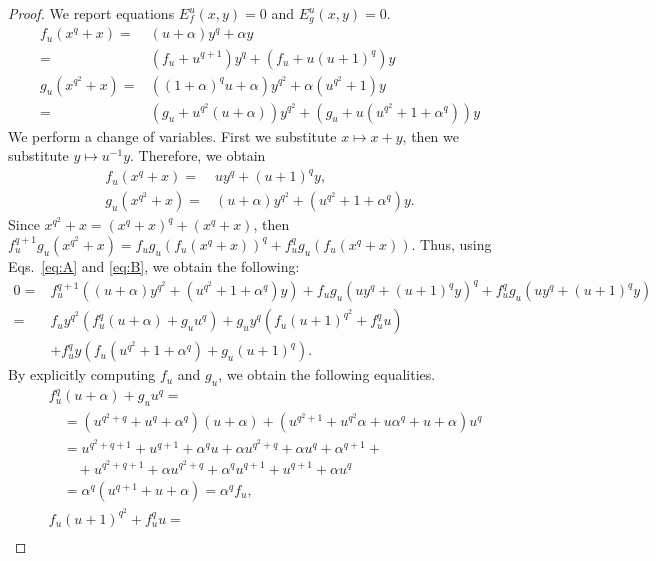 \documentclass{article}
\begin{document}
\begin{proof}
We report equations $E_f^u(x,y)=0$ and  $E_g^u(x,y)=0$.
\begin{align*}
   f_u(x^q+x)=&{(u+\alpha)}y^q+{\alpha} y\\
   =&\left(f_u+{u^{q+1}}\right)y^q+\left(f_u+{u(u+1)^q}\right)y\\
    g_u(x^{q^2}+x)=&{((1+\alpha)^qu+\alpha)}y^{q^2}+{\alpha(u^{q^2}+1)}y\\
    =&\left(g_u+{u^{q^2}(u+\alpha)}\right)y^{q^2}+\left(g_u+{u(u^{q^2}+1+\alpha^q)}\right)y
\end{align*}
We perform  a change of variables. First we substitute $x\mapsto x+y$, then we substitute $y\mapsto u^{-1}y$. %
Therefore, we obtain
\begin{align}
  f_u (x^q+x)
   =&uy^q+{(u+1)^q}y,\label{eq:A} \\
    g_u(x^{q^2}+x)=&({u+\alpha})y^{q^2}+({u^{q^2}+1+\alpha^q})y. \label{eq:B}
\end{align}
Since $x^{q^2}+x=(x^q+x)^q+(x^q+x)$, then 
$f_u^{q+1}g_u(x^{q^2}+x)=f_ug_u\left(f_u(x^q+x)\right)^q+f_u^qg_u\left(f_u(x^q+x)\right)$.
Thus,  using  Eqs.\ \eqref{eq:A} and \eqref{eq:B}, we obtain the  following:
\begin{align*}
0=&f_u^{q+1}\left(({u+\alpha})y^{q^2}+({u^{q^2}+1+\alpha^q})y\right)
+f_ug_u\left(uy^q+{(u+1)^q}y\right)^q+f_u^qg_u\left(uy^q+{(u+1)^q}y\right)\\
=&f_uy^{q^2}\left(f_u^q(u+\alpha)+g_uu^q\right)
+g_uy^q\left(f_u(u+1)^{q^2}+f_u^qu\right)\\
&+f_u^qy\left(f_u(u^{q^2}+1+\alpha^q)+g_u(u+1)^q\right).
\end{align*}
By explicitly computing $f_u$ and $g_u$, we obtain the following equalities.
\begin{align*}
    & f_u^q(u+\alpha)+g_uu^q=\\
    &\quad=
    (u^{q^2+q}+u^q+\alpha^q)(u+\alpha)+(u^{q^2+1}+u^{q^2}\alpha+u\alpha^q+u+\alpha)u^q\\
    &\quad=u^{q^2+q+1}+u^{q+1}+\alpha^qu+\alpha u^{q^2+q}+\alpha u^q+\alpha^{q+1}+ \\
   & \quad\quad+u^{q^2+q+1}+\alpha u^{q^2+q}+\alpha^q u^{q+1}+u^{q+1}+\alpha u^q\\
    &\quad=\alpha^q(u^{q+1}+u+\alpha)=\alpha^qf_u,\\
    &f_u(u+1)^{q^2}+f_u^qu=\\

\end{align*}
\end{proof}
\end{document}

